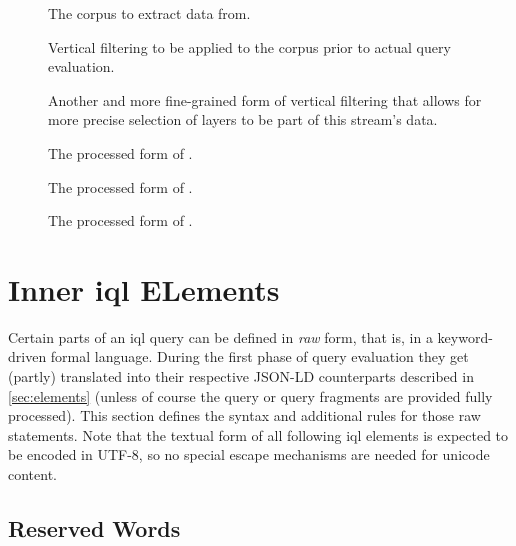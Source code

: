 \documentclass[11pt,a4paper]{article}
\begin{document}
\begin{elements}{}
\end{elements}
\begin{description}
	\item[] The corpus to extract data from.
	\item[] Vertical filtering to be applied to the corpus prior to actual query evaluation.
	\item[] Another and more fine-grained form of vertical filtering that allows for more precise selection of layers to be part of this stream's data.
	\item[] The processed form of .
	\item[] The processed form of .
	\item[] The processed form of .
\end{description}


\section{Inner \ac{iql} ELements}
\label{sec:inner-iql-elements}

Certain parts of an \ac{iql} query can be defined in \textit{raw} form, that is, in a keyword-driven formal language.
During the first phase of query evaluation they get (partly) translated into their respective JSON-LD counterparts described in \cref{sec:elements} (unless of course the query or query fragments are provided fully processed).
This section defines the syntax and additional rules for those raw statements.
Note that the textual form of all following \ac{iql} elements is expected to be encoded in UTF-8, so no special escape mechanisms are needed for unicode content.


\subsection{Reserved Words}
\label{sec:reserved-words}
\end{document}
